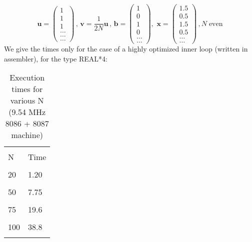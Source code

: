 \begin{equation*}
 \label{eq:09_25_}
    \mathbf{u}=
    \begin{pmatrix}
        1\\ 
        1\\ 
        1\\ 
        \dots\\ 
        \dots\\ 
        \dots
    \end{pmatrix}
    \, ,\, 
    \mathbf{v}=\frac{1}{2N} \mathbf{u}\, , \, 
    \mathbf{b} =
    \begin{pmatrix}
        1\\ 
        0\\ 
        1\\ 
        0\\ 
        \dots\\ 
        \dots
    \end{pmatrix}
    ,\, \,  
    \mathbf{x}=
    \begin{pmatrix}
        1.5\\ 
        0.5\\ 
        1.5\\ 
        0.5\\ 
        \dots\\ 
        \dots
    \end{pmatrix}
    \, , N \; \textrm{even}
\end{equation*}
We give the times only for the case of a highly optimized inner
loop (written in assembler), for the type REAL*4:

\begin{table}
    \centering
    \caption{Execution times for various N (9.54 MHz 8086 + 8087 machine)}
        \bigskip
    \label{tbl:09_01} 
    \setlength{\tabcolsep}{40pt}
        \begin{tabular}{|ll|}
            \hline & \\
            N   &  Time\\
            & \\
            20  &  1.20\\
            & \\
            50  &  7.75\\
            & \\
            75  &  19.6\\
            & \\
            100 &  38.8\\
            & \\
            \hline
        \end{tabular}
\end{table}

